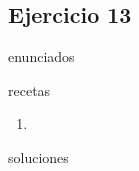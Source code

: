\subsection{Ejercicio 13}
\def\parte{enunciados}
\ifx\capitulo\parte

\fi

\def\parte{recetas}
\ifx\capitulo\parte
\begin{enumerate}
\item
\end{enumerate}
\fi

\def\parte{soluciones}
\ifx\capitulo\parte
%
\fi
